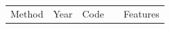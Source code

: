 \documentclass[../paper.tex]{subfiles}
\begin{document}
\begin{table}
    \begin{tabular}{lrrlp{2cm}}
        \toprule
        Method                                     & Year & Code         &                      & Features            \\

\end{tabular}
\end{table}
\end{document}
